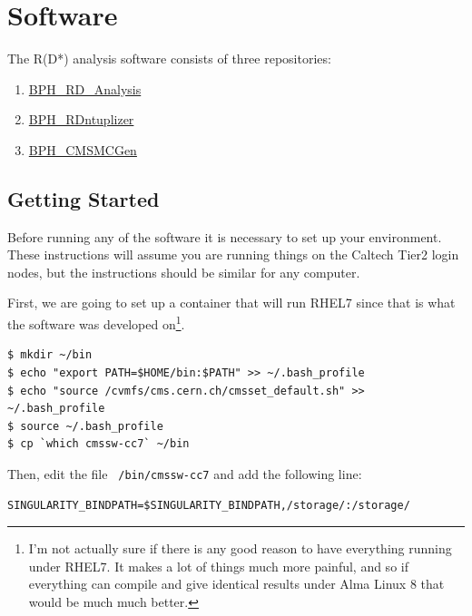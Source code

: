 \documentclass[12pt]{report}
\begin{document}
\chapter{Software}
The R(D*) analysis software consists of three repositories:
\begin{enumerate}
\item \href{https://github.com/alatorre-caltech/BPH\_RD\_Analysis}{BPH\_RD\_Analysis}
\item \href{https://github.com/alatorre-caltech/BPH\_RDntuplizer}{BPH\_RDntuplizer}
\item \href{https://github.com/alatorre-caltech/BPH\_CMSMCGen}{BPH\_CMSMCGen}
\end{enumerate}
\section{Getting Started}
Before running any of the software it is necessary to set up your environment.
These instructions will assume you are running things on the Caltech Tier2
login nodes, but the instructions should be similar for any computer.

First, we are going to set up a container that will run RHEL7 since that is
what the software was developed on\footnote{I'm not actually sure if there is
any good reason to have everything running under RHEL7. It makes a lot of
things much more painful, and so if everything can compile and give identical
results under Alma Linux 8 that would be much much better.}.

\begin{mdframed}[backgroundcolor=light-gray, roundcorner=10pt,leftmargin=1, rightmargin=1, innerleftmargin=15, innertopmargin=15,innerbottommargin=15, outerlinewidth=1, linecolor=light-gray,roundcorner=20pt]
\begin{lstlisting}
$ mkdir ~/bin
$ echo "export PATH=$HOME/bin:$PATH" >> ~/.bash_profile
$ echo "source /cvmfs/cms.cern.ch/cmsset_default.sh" >> ~/.bash_profile
$ source ~/.bash_profile
$ cp `which cmssw-cc7` ~/bin
\end{lstlisting}
\end{mdframed}

Then, edit the file \texttt{~/bin/cmssw-cc7} and add the following line:

\begin{mdframed}[backgroundcolor=light-gray, roundcorner=10pt,leftmargin=1, rightmargin=1, innerleftmargin=15, innertopmargin=15,innerbottommargin=15, outerlinewidth=1, linecolor=light-gray,roundcorner=20pt]
\begin{lstlisting}
SINGULARITY_BINDPATH=$SINGULARITY_BINDPATH,/storage/:/storage/
\end{lstlisting}
\end{mdframed}
\end{document}
